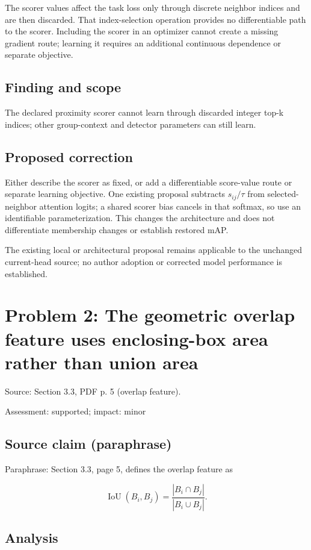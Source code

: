 \documentclass[11pt]{article}
\begin{document}
The scorer values affect the task loss only through discrete neighbor indices and are then discarded. That index-selection operation provides no differentiable path to the scorer. Including the scorer in an optimizer cannot create a missing gradient route; learning it requires an additional continuous dependence or separate objective.

\subsection*{Finding and scope}

The declared proximity scorer cannot learn through discarded integer top-k indices; other group-context and detector parameters can still learn.

\subsection*{Proposed correction}

Either describe the scorer as fixed, or add a differentiable score-value route or separate learning objective. One existing proposal subtracts \(s_{ij}/\tau\) from selected-neighbor attention logits; a shared scorer bias cancels in that softmax, so use an identifiable parameterization. This changes the architecture and does not differentiate membership changes or establish restored mAP.

The existing local or architectural proposal remains applicable to the unchanged current-head source; no author adoption or corrected model performance is established.

\section*{Problem 2: The geometric overlap feature uses enclosing-box area rather than union area}

Source: Section 3.3, PDF p. 5 (overlap feature).

Assessment: supported; impact: minor

\subsection*{Source claim (paraphrase)}

Paraphrase: Section 3.3, page 5, defines the overlap feature as

\[\operatorname{IoU}(B_i,B_j)=\frac{|B_i\cap B_j|}{|B_i\cup B_j|}. \]

\subsection*{Analysis}
\end{document}
